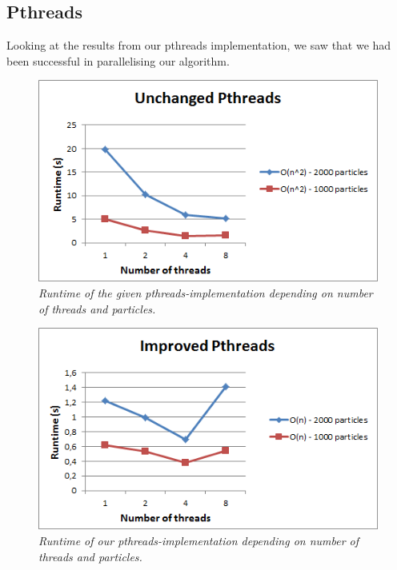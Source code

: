 \documentclass[11pt,a4paper]{article}
\begin{document}
\subsection{Pthreads}
Looking at the results from our pthreads implementation, we saw that we had been successful in parallelising our algorithm. \newpage
\vspace{10pt}
\begin{figure}[htb]
\centering
\includegraphics[scale=0.8]{pics/pth1.png}
\caption{\emph{Runtime of the given pthreads-implementation depending on number of threads and particles.}}
\label{fig:gird}
\end{figure}
\vspace{10pt}

\begin{figure}[htb]
\centering
\includegraphics[scale=0.8]{pics/pth2.png}
\caption{\emph{Runtime of our pthreads-implementation depending on number of threads and particles.}}
\label{fig:gird}
\end{figure}
\newpage
\end{document}
